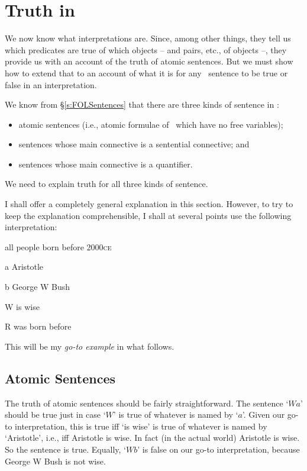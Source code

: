 \chapter{Truth in \textnormal{\FOL}}\label{s:TruthFOL}
We now know what interpretations are. Since, among other things, they tell us which predicates are true of which objects – and pairs, etc., of objects –, they provide us with an account of the truth of atomic sentences. But we must show how to extend that to an account of what it is for any \FOL\ sentence to be true or false in an interpretation. 

We know from §\ref{s:FOLSentences} that there are three kinds of sentence in \FOL: 
	\begin{itemize}
		\item atomic sentences (i.e., atomic formulae of \FOL\ which have no free variables);
		\item sentences whose main connective is a sentential connective; and
		\item sentences whose main connective is a quantifier.
	\end{itemize}
We need to explain truth for all three kinds of sentence.

I shall offer a completely general explanation in this section. However, to try to keep the explanation comprehensible, I shall at several points use the following interpretation:
	\begin{ekey}
		\item[\domain] all people born before 2000\textsc{ce}
		\item[a] Aristotle
		\item[b] George W Bush
		\item[W]  is wise
		\item[R]  was born before 
	\end{ekey}
This will be my \emph{go-to example} in what follows. 

\section{Atomic Sentences}\label{fol.truth.atom}
The truth of atomic sentences should be fairly straightforward. The sentence `$Wa$' should be true just in case `$W$' is true of whatever is named by `$a$'. Given our go-to interpretation, this is true iff `is wise' is true of whatever is named by `Aristotle', i.e., iff Aristotle is wise. In fact (in the actual world) Aristotle is wise. So the sentence is true. Equally, `$Wb$' is false on our go-to interpretation, because George W Bush is not wise.

